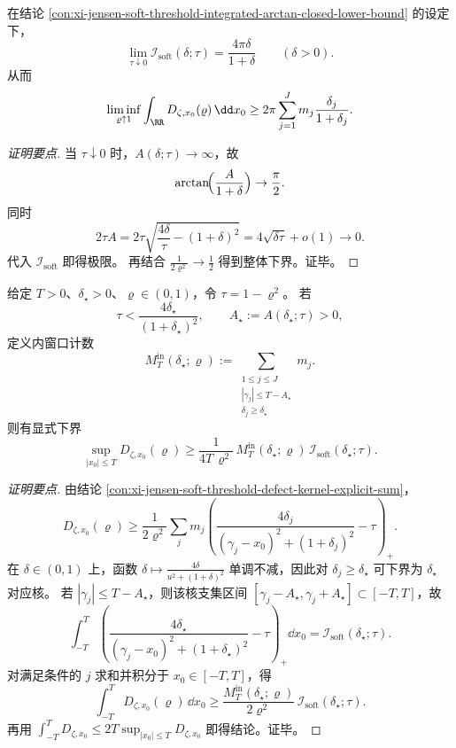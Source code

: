 \begin{conclusion}\label{con:xi-jensen-soft-threshold-integrated-limit-rigidity}
在结论 \ref{con:xi-jensen-soft-threshold-integrated-arctan-closed-lower-bound} 的设定下，
\[
\lim_{\tau\downarrow 0}\mathcal I_{\mathrm{soft}}(\delta;\tau)
=\frac{4\pi\delta}{1+\delta}\qquad(\delta>0).
\]
从而
\[
\liminf_{\varrho\uparrow 1}\int_{\RR}D_{\zeta,x_0}(\varrho)\,\dd x_0
\ge
2\pi\sum_{j=1}^{J}m_j\frac{\delta_j}{1+\delta_j}.
\]
\end{conclusion}
\begin{proof}[证明要点]
当 \(\tau\downarrow 0\) 时，\(A(\delta;\tau)\to\infty\)，故
\[
\arctan\!\Bigl(\frac{A}{1+\delta}\Bigr)\to\frac\pi2.
\]
同时
\[
2\tau A
=2\tau\sqrt{\frac{4\delta}{\tau}-(1+\delta)^2}
=4\sqrt{\delta\tau}+o(1)\to 0.
\]
代入 \(\mathcal I_{\mathrm{soft}}\) 即得极限。
再结合
\(
\frac1{2\varrho^2}\to\frac12
\)
得到整体下界。证毕。
\end{proof}

\begin{conclusion}\label{con:xi-jensen-soft-threshold-window-sup-lower-bound}
给定 \(T>0\)、\(\delta_\star>0\)、\(\varrho\in(0,1)\)，令 \(\tau=1-\varrho^2\)。
若
\[
\tau<\frac{4\delta_\star}{(1+\delta_\star)^2},
\qquad
A_\star:=A(\delta_\star;\tau)>0,
\]
定义内窗口计数
\[
M_T^{\mathrm{in}}(\delta_\star;\varrho)
:=\sum_{\substack{1\le j\le J\\ |\gamma_j|\le T-A_\star\\ \delta_j\ge \delta_\star}}m_j.
\]
则有显式下界
\[
\sup_{|x_0|\le T}D_{\zeta,x_0}(\varrho)
\ge
\frac{1}{4T\,\varrho^2}\,
M_T^{\mathrm{in}}(\delta_\star;\varrho)\,
\mathcal I_{\mathrm{soft}}(\delta_\star;\tau).
\]
\end{conclusion}
\begin{proof}[证明要点]
由结论 \ref{con:xi-jensen-soft-threshold-defect-kernel-explicit-sum}，
\[
D_{\zeta,x_0}(\varrho)\ge
\frac1{2\varrho^2}\sum_j m_j
\left(\frac{4\delta_j}{(\gamma_j-x_0)^2+(1+\delta_j)^2}-\tau\right)_+.
\]
在 \(\delta\in(0,1)\) 上，函数
\(
\delta\mapsto \frac{4\delta}{u^2+(1+\delta)^2}
\)
单调不减，因此对 \(\delta_j\ge\delta_\star\) 可下界为 \(\delta_\star\) 对应核。
若 \(|\gamma_j|\le T-A_\star\)，则该核支集区间 \([\gamma_j-A_\star,\gamma_j+A_\star]\subset[-T,T]\)，故
\[
\int_{-T}^{T}\left(\frac{4\delta_\star}{(\gamma_j-x_0)^2+(1+\delta_\star)^2}-\tau\right)_+\dd x_0
=\mathcal I_{\mathrm{soft}}(\delta_\star;\tau).
\]
对满足条件的 \(j\) 求和并积分于 \(x_0\in[-T,T]\)，得
\[
\int_{-T}^{T}D_{\zeta,x_0}(\varrho)\,\dd x_0
\ge
\frac{M_T^{\mathrm{in}}(\delta_\star;\varrho)}{2\varrho^2}\,
\mathcal I_{\mathrm{soft}}(\delta_\star;\tau).
\]
再用
\(
\int_{-T}^{T}D_{\zeta,x_0}\le 2T\sup_{|x_0|\le T}D_{\zeta,x_0}
\)
即得结论。证毕。
\end{proof}

